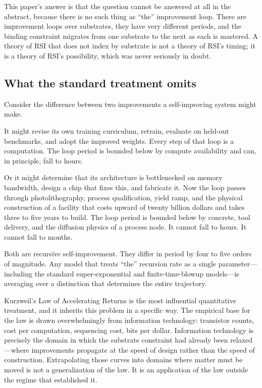 \documentclass[11pt]{article}
\begin{document}
This paper's answer is that the question cannot be answered at all in the abstract, because there is no such thing as ``the'' improvement loop. There are improvement loops over substrates, they have very different periods, and the binding constraint migrates from one substrate to the next as each is mastered. A theory of RSI that does not index by substrate is not a theory of RSI's timing; it is a theory of RSI's possibility, which was never seriously in doubt.

\subsection{What the standard treatment omits}

Consider the difference between two improvements a self-improving system might make.

It might revise its own training curriculum, retrain, evaluate on held-out benchmarks, and adopt the improved weights. Every step of that loop is a computation. The loop period is bounded below by compute availability and can, in principle, fall to hours.

Or it might determine that its architecture is bottlenecked on memory bandwidth, design a chip that fixes this, and fabricate it. Now the loop passes through photolithography, process qualification, yield ramp, and the physical construction of a facility that costs upward of twenty billion dollars and takes three to five years to build. The loop period is bounded below by concrete, tool delivery, and the diffusion physics of a process node. It cannot fall to hours. It cannot fall to months.

Both are recursive self-improvement. They differ in period by four to five orders of magnitude. Any model that treats ``the'' recursion rate as a single parameter---including the standard super-exponential and finite-time-blowup models---is averaging over a distinction that determines the entire trajectory.

Kurzweil's Law of Accelerating Returns \citep{kurzweil2005,kurzweil2024} is the most influential quantitative treatment, and it inherits this problem in a specific way. The empirical base for the law is drawn overwhelmingly from information technology: transistor counts, cost per computation, sequencing cost, bits per dollar. Information technology is precisely the domain in which the substrate constraint had already been relaxed---where improvements propagate at the speed of design rather than the speed of construction. Extrapolating those curves into domains where matter must be moved is not a generalization of the law. It is an application of the law outside the regime that established it.
\end{document}
